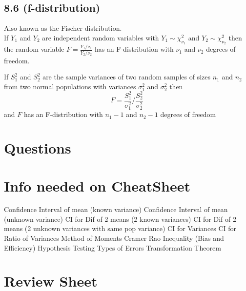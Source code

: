 \documentclass[answers,12pt,addpoints]{exam}
\begin{document}
\subsection{8.6 (f-distribution)}
\begin{definition}[F-Distribution]
    Also known as the Fischer distribution.\\
    If $Y_1$ and $Y_2$ are independent random variables with $Y_1 \sim \chi^2_{\nu_1}$ and $Y_2 \sim \chi^2_{\nu_2}$ then the random variable $F = \frac{Y_1/\nu_1}{Y_2/\nu_2}$ has an F-distribution with $\nu_1$ and $\nu_2$ degrees of freedom.\\
\end{definition}
\begin{definition}
    If $S_1^2$ and $S_2^2$ are the sample variances of two random samples of sizes $n_1$ and $n_2$ from two normal populations with variances $\sigma_1^2$ and $\sigma_2^2$ then
    $$F = \frac{S_1^2}{\sigma_1^2} / \frac{S_2^2}{\sigma_2^2}$$
    and $F$ has an F-distribution with $n_1 - 1$ and $n_2 - 1$ degrees of freedom
\end{definition}

\section{Questions}

\section{Info needed on CheatSheet}
Confidence Interval of mean (known variance)
Confidence Interval of mean (unknown variance)
CI for Dif of 2 means (2 known variances)
CI for Dif of 2 means (2 unknown variances with same pop variance)
CI for Variances 
CI for Ratio of Variances
Method of Moments
Cramer Rao Inequality (Bias and Efficiency)
Hypothesis Testing
Types of Errors
Transformation Theorem




\section*{Review Sheet}
\end{document}
